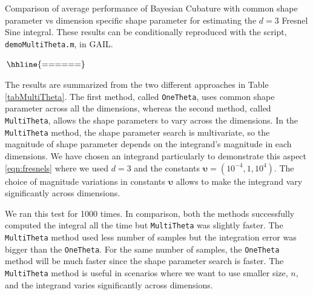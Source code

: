 \documentclass{iitthesis}          %
\newcommand{\bm}[1]{\boldsymbol{#1}}
\newcommand{\code}[1]{\texttt{#1}}
\begin{document}
{{{{{{\begin{table}[ht] %
	\centering
	\caption{Comparison of average performance of Bayesian Cubature with common shape parameter vs dimension specific shape parameter
		 for estimating the $d=3$ Fresnel Sine integral. These results can be conditionally reproduced with the script, \code{demoMultiTheta.m}, in GAIL. 
		\label{tabMultiTheta}}	   
	$
	\arraycolsep=1.4pt\def\arraystretch{0.9}
\begin{array}{l@{\quad}r@{\quad}r@{\quad}r@{\quad}r@{\quad}r@{\quad}r}
\hhline{======}
 
\end{array}	
	$
\end{table}

The results are summarized from the two different approaches in Table \ref{tabMultiTheta}. The first method, called \code{OneTheta}, uses common shape parameter across all the dimensions, whereas the second method, called \code{MultiTheta}, allows the shape parameters to vary across the dimensions. In the \code{MultiTheta} method, the shape parameter search is multivariate, so the magnitude of shape parameter depends on the integrand's magnitude in each dimensions. We have chosen an integrand particularly to demonstrate this aspect \eqref{eqn:fresnels} where we used $d=3$ and the constants $\bm{\upsilon}= (10^{-4}, 1, 10^4)$. The choice of magnitude variations in constants $\bm{\upsilon}$ allows to make the integrand vary significantly across dimensions.

We ran this test for 1000 times. In comparison, both the methods successfully computed the integral all the time but \code{MultiTheta} was slightly faster. The \code{MultiTheta} method used less number of samples but the integration error was bigger than the \code{OneTheta}. For the same number of samples, the \code{OneTheta} method will be much faster since the shape parameter search is faster. The \code{MultiTheta} method is useful in scenarios where we want to use smaller size, $n$, and the integrand varies significantly across dimensions.


\iffalse


}}}}}}
\end{document}
